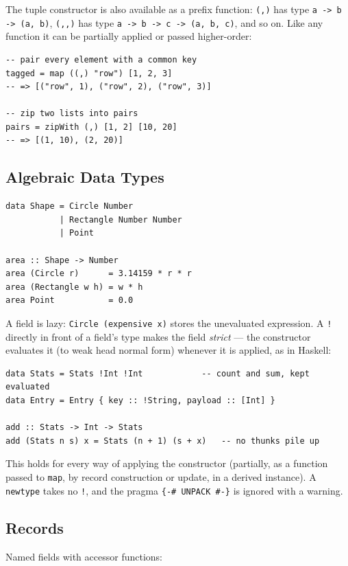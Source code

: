\documentclass[11pt,a4paper]{article}
\begin{document}
The tuple constructor is also available as a prefix function: \texttt{(,)}
has type \texttt{a -> b -> (a, b)}, \texttt{(,,)} has type
\texttt{a -> b -> c -> (a, b, c)}, and so on.  Like any function it can be
partially applied or passed higher-order:

\begin{lstlisting}
-- pair every element with a common key
tagged = map ((,) "row") [1, 2, 3]
-- => [("row", 1), ("row", 2), ("row", 3)]

-- zip two lists into pairs
pairs = zipWith (,) [1, 2] [10, 20]
-- => [(1, 10), (2, 20)]
\end{lstlisting}

\subsection{Algebraic Data Types}

\begin{lstlisting}
data Shape = Circle Number
           | Rectangle Number Number
           | Point

area :: Shape -> Number
area (Circle r)      = 3.14159 * r * r
area (Rectangle w h) = w * h
area Point           = 0.0
\end{lstlisting}

A field is lazy: \texttt{Circle (expensive x)} stores the unevaluated
expression.  A \texttt{!} directly in front of a field's type makes the
field \emph{strict} --- the constructor evaluates it (to weak head
normal form) whenever it is applied, as in Haskell:

\begin{lstlisting}
data Stats = Stats !Int !Int            -- count and sum, kept evaluated
data Entry = Entry { key :: !String, payload :: [Int] }

add :: Stats -> Int -> Stats
add (Stats n s) x = Stats (n + 1) (s + x)   -- no thunks pile up
\end{lstlisting}

This holds for every way of applying the constructor (partially, as a
function passed to \texttt{map}, by record construction or update, in a
derived instance).  A \texttt{newtype} takes no \texttt{!}, and the pragma
\texttt{\{-\# UNPACK \#-\}} is ignored with a warning.

\subsection{Records}

Named fields with accessor functions:
\end{document}
